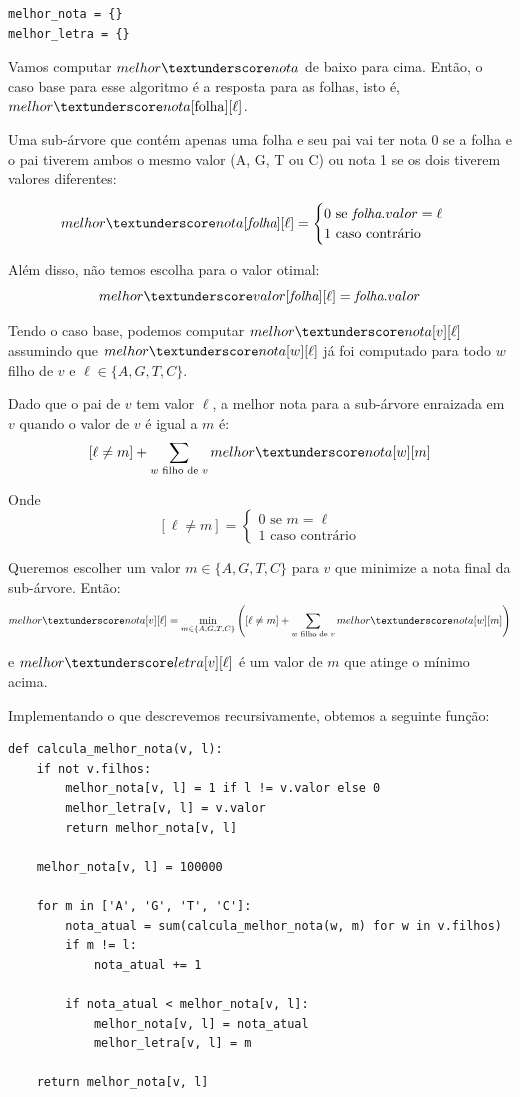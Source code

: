 \documentclass[11pt]{article}
\newcommand{\tu}{\textunderscore}
\begin{document}
\begin{verbatim}
melhor_nota = {}
melhor_letra = {}
\end{verbatim}

Vamos computar $melhor \tu nota$ de baixo para cima. Então, o caso base
para esse algoritmo é a resposta para as folhas, isto é, $melhor\tu nota[\mathrm{folha}][\ell]$.

Uma sub-árvore que contém apenas uma folha e seu pai vai ter
nota 0 se a folha e o pai tiverem ambos o mesmo valor (A,
G, T ou C) ou nota 1 se os dois tiverem valores diferentes:

\[melhor \tu nota[\textit{folha}][\ell] = \begin{cases}0 \text{ se } \textit{folha}.valor = \ell \\
                                                       1 \text{ caso contrário}\end{cases}\]

Além disso, não temos escolha para o valor otimal:
\[ melhor \tu valor[\textit{folha}][\ell] = \textit{folha}.valor \]

Tendo o caso base, podemos computar $melhor \tu nota[v][\ell]$
assumindo que $melhor \tu nota[w][\ell]$ já foi computado para todo
$w$ filho de $v$ e $\ell \in \{A, G, T, C\}$.

Dado que o pai de $v$ tem valor $\ell$, a melhor nota para a
sub-árvore enraizada em $v$ quando o valor de $v$ é igual a $m$ é:
\[ [\ell \neq m] + \sum_{w \text{ filho de }v} melhor \tu nota[w][m]\]

Onde \[[\ell \neq m] =  \begin{cases} 0 \text{ se } m = \ell \\
                                      1 \text{ caso contrário}\end{cases}\]

Queremos escolher um valor $m \in \{A, G, T, C\}$ para $v$
que minimize a nota final da sub-árvore. Então:
\[melhor \tu nota[v][\ell] = \min_{m \in \{A, G, T, C\}} \left([\ell
\neq m] + \sum_{w \text{ filho de }v} melhor \tu nota[w][m]\right)\]

e $melhor\tu letra[v][\ell]$ é um valor de $m$ que atinge o mínimo
acima.

Implementando o que descrevemos recursivamente, obtemos a seguinte
função:
\begin{verbatim}
def calcula_melhor_nota(v, l):
    if not v.filhos:
        melhor_nota[v, l] = 1 if l != v.valor else 0
        melhor_letra[v, l] = v.valor
        return melhor_nota[v, l]

    melhor_nota[v, l] = 100000

    for m in ['A', 'G', 'T', 'C']:
        nota_atual = sum(calcula_melhor_nota(w, m) for w in v.filhos)
        if m != l:
            nota_atual += 1

        if nota_atual < melhor_nota[v, l]:
            melhor_nota[v, l] = nota_atual
            melhor_letra[v, l] = m

    return melhor_nota[v, l]
\end{verbatim}
\end{document}

